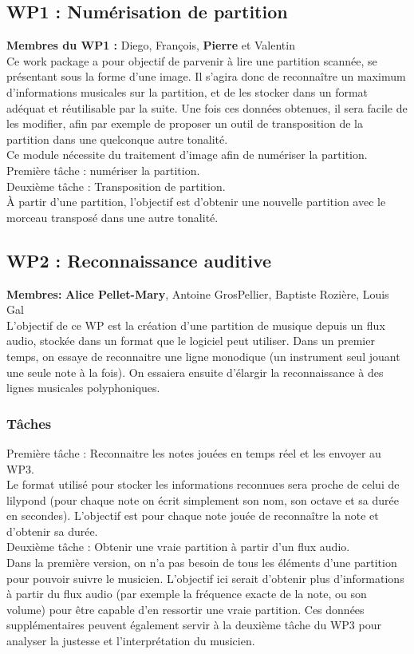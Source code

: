 \documentclass{article}
\begin{document}
\subsection{WP1 : Numérisation de partition} 
\noindent \textbf{Membres du WP1 : } Diego, François, {\bf Pierre} et Valentin\\
Ce work package a pour objectif de parvenir à lire une partition scannée, se présentant sous la forme d'une image. Il s'agira donc de reconnaître un maximum d'informations musicales sur la partition, et de les stocker dans un format adéquat et réutilisable par la suite. Une fois ces données obtenues, il sera facile de les modifier, afin par exemple de proposer un outil de transposition de la partition dans une quelconque autre tonalité.\\
Ce module nécessite du traitement d'image afin de numériser la partition.\\
Première tâche : numériser la partition.\\
Deuxième tâche : Transposition de partition.\\
À partir d'une partition, l'objectif est d'obtenir une nouvelle partition avec le morceau transposé dans une autre tonalité.

\subsection{WP2 : Reconnaissance auditive}
\noindent \textbf{Membres: } \textbf{Alice Pellet-Mary}, Antoine GrosPellier, Baptiste Rozière, Louis Gal\\
L'objectif de ce WP est la création d'une partition de musique depuis un flux audio, stockée dans un format que le logiciel peut utiliser. Dans un premier temps, on essaye de reconnaitre une ligne monodique (un instrument seul jouant une seule note à la fois). On essaiera ensuite d'élargir la reconnaissance à des lignes musicales polyphoniques.\\
\subsubsection{Tâches}
Première tâche : Reconnaitre les notes jouées en temps réel et les envoyer au WP3.\\
Le format utilisé pour stocker les informations reconnues sera proche de celui de lilypond (pour chaque note on écrit simplement son nom, son octave et sa durée en secondes). L'objectif est pour chaque note jouée de reconnaître la note et d'obtenir sa durée.\\
Deuxième tâche : Obtenir une vraie partition à partir d'un flux audio.\\
Dans la première version, on n'a pas besoin de tous les éléments d'une partition pour pouvoir suivre le musicien. L'objectif ici serait d'obtenir plus d'informations à partir du flux audio (par exemple la fréquence exacte de la note, ou son volume) pour \^etre capable d'en ressortir une vraie partition. Ces données supplémentaires peuvent également servir à la deuxième tâche du WP3 pour analyser la justesse et l'interprétation du musicien.
\end{document}

